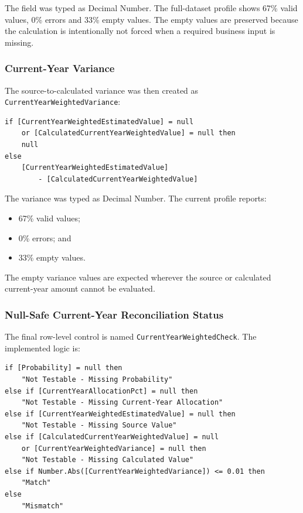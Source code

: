\documentclass[11pt,a4paper]{article}
\begin{document}
The field was typed as Decimal Number. The full-dataset profile shows 67\%
valid values, 0\% errors and 33\% empty values. The empty values are preserved
because the calculation is intentionally not forced when a required business
input is missing.

\subsubsection*{Current-Year Variance}

The source-to-calculated variance was then created as
\texttt{CurrentYearWeightedVariance}:

\begin{lstlisting}[style=powerquery]
if [CurrentYearWeightedEstimatedValue] = null
    or [CalculatedCurrentYearWeightedValue] = null then
    null
else
    [CurrentYearWeightedEstimatedValue]
        - [CalculatedCurrentYearWeightedValue]
\end{lstlisting}

The variance was typed as Decimal Number. The current profile reports:

\begin{itemize}[leftmargin=7mm,itemsep=2pt]
    \item 67\% valid values;
    \item 0\% errors; and
    \item 33\% empty values.
\end{itemize}

The empty variance values are expected wherever the source or calculated
current-year amount cannot be evaluated.

\subsubsection*{Null-Safe Current-Year Reconciliation Status}

The final row-level control is named
\texttt{CurrentYearWeightedCheck}. The implemented logic is:

\begin{lstlisting}[style=powerquery]
if [Probability] = null then
    "Not Testable - Missing Probability"
else if [CurrentYearAllocationPct] = null then
    "Not Testable - Missing Current-Year Allocation"
else if [CurrentYearWeightedEstimatedValue] = null then
    "Not Testable - Missing Source Value"
else if [CalculatedCurrentYearWeightedValue] = null
    or [CurrentYearWeightedVariance] = null then
    "Not Testable - Missing Calculated Value"
else if Number.Abs([CurrentYearWeightedVariance]) <= 0.01 then
    "Match"
else
    "Mismatch"
\end{lstlisting}
\end{document}
